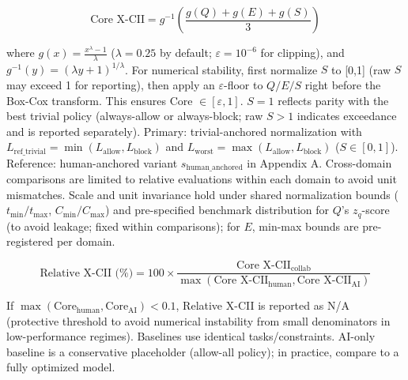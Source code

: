 \documentclass{article}
\begin{document}
\[
\text{Core X-CII} = g^{-1}\left( \frac{g(Q) + g(E) + g(S)}{3} \right)
\]

where $g(x) = \frac{x^\lambda - 1}{\lambda}$ ($\lambda = 0.25$ by default; $\varepsilon = 10^{-6}$ for clipping), and $g^{-1}(y) = (\lambda y + 1)^{1/\lambda}$. For numerical stability, first normalize $S$ to [0,1] (raw $S$ may exceed 1 for reporting), then apply an $\varepsilon$-floor to $Q/E/S$ right before the Box-Cox transform. This ensures Core $\in [\varepsilon,1]$. $S=1$ reflects parity with the best trivial policy (always-allow or always-block; raw $S>1$ indicates exceedance and is reported separately). Primary: trivial-anchored normalization with $L_{\mathrm{ref\_trivial}} = \min(L_{\mathrm{allow}}, L_{\mathrm{block}})$ and $L_{\mathrm{worst}} = \max(L_{\mathrm{allow}}, L_{\mathrm{block}})$ ($S \in [0,1]$). Reference: human-anchored variant $s_{\mathrm{human\_anchored}}$ in Appendix A. Cross-domain comparisons are limited to relative evaluations within each domain to avoid unit mismatches. Scale and unit invariance hold under shared normalization bounds ($t_{\min}/t_{\max}$, $C_{\min}/C_{\max}$) and pre-specified benchmark distribution for $Q$'s $z_q$-score (to avoid leakage; fixed within comparisons); for $E$, min-max bounds are pre-registered per domain.

\[
\text{Relative X-CII (\%)} = 100 \times \frac{\text{Core X-CII}_{\text{collab}}}{\max(\text{Core X-CII}_{\text{human}}, \text{Core X-CII}_{\text{AI}})}
\]

If $\max(\text{Core}_{\text{human}}, \text{Core}_{\text{AI}}) < 0.1$, Relative X-CII is reported as N/A (protective threshold to avoid numerical instability from small denominators in low-performance regimes). Baselines use identical tasks/constraints. AI-only baseline is a conservative placeholder (allow-all policy); in practice, compare to a fully optimized model.
\end{document}
